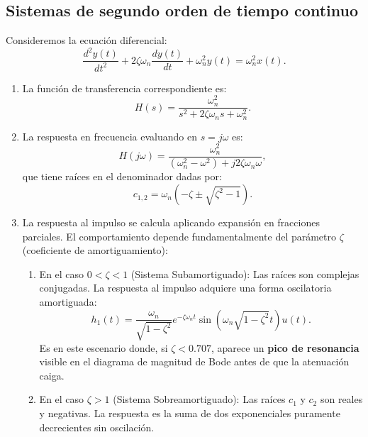 \subsection{Sistemas de segundo orden de tiempo continuo}

Consideremos la ecuaci\'{o}n diferencial:
\begin{equation}
	\frac{d^{2}y(t)}{dt^{2}} + 2\zeta \omega_{n} \frac{dy(t)}{dt} + \omega_{n}^{2} y(t) = \omega_{n}^{2} x(t).
\end{equation}

\begin{enumerate}
	\item La funci\'{o}n de transferencia correspondiente es:
	\begin{equation}
		H(s) = \frac{\omega_{n}^{2}}{s^{2} + 2\zeta \omega_{n} s + \omega_{n}^{2}}.
	\end{equation}
	
	\item La respuesta en frecuencia evaluando en $s = j\omega$ es:
	\begin{equation}
		H(j\omega) = \frac{\omega_{n}^{2}}{(\omega_{n}^{2} - \omega^{2}) + j 2\zeta \omega_{n} \omega},
	\end{equation}
	que tiene ra\'{i}ces en el denominador dadas por:
	\begin{equation}
		c_{1,2} = \omega_{n} \left( -\zeta \pm \sqrt{\zeta^{2}-1} \right).
	\end{equation}
	
	\item La respuesta al impulso se calcula aplicando expansi\'{o}n en fracciones parciales. El comportamiento depende fundamentalmente del par\'{a}metro $\zeta$ (coeficiente de amortiguamiento):
	
	\begin{enumerate}
		\item En el caso $0 < \zeta < 1$ (Sistema Subamortiguado): Las ra\'{i}ces son complejas conjugadas. La respuesta al impulso adquiere una forma oscilatoria amortiguada:
		\begin{equation}
			h_{1}(t) = \frac{\omega_{n}}{\sqrt{1-\zeta^{2}}} e^{-\zeta \omega_{n} t} \sin\left(\omega_{n}\sqrt{1-\zeta^{2}}t\right) u(t).
		\end{equation}
		Es en este escenario donde, si $\zeta < 0.707$, aparece un \textbf{pico de resonancia} visible en el diagrama de magnitud de Bode antes de que la atenuaci\'{o}n caiga.
		
		\item En el caso $\zeta > 1$ (Sistema Sobreamortiguado): Las ra\'{i}ces $c_{1}$ y $c_{2}$ son reales y negativas. La respuesta es la suma de dos exponenciales puramente decrecientes sin oscilaci\'{o}n.
		

\end{enumerate}
\end{enumerate}
